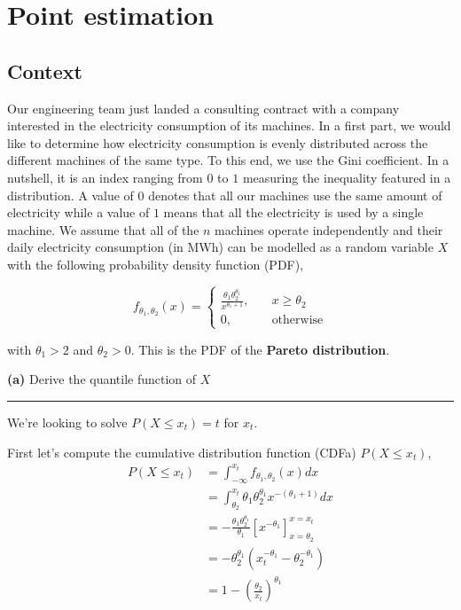 \documentclass[10pt, a4paper, nofootinbib]{scrartcl}
\begin{document}
\section{Point estimation}

\subsection*{Context}
Our engineering team just landed a consulting contract with a company interested in the electricity consumption of its machines. In a first part, we would like to determine how electricity consumption is evenly distributed across the different machines of the same type. To this end, we use the Gini coefficient. In a nutshell, it is an index ranging from $0$ to $1$ measuring the inequality featured in a distribution. A value of $0$ denotes that all our machines use the same amount of electricity while a value of $1$ means that all the electricity is used by a single machine.
We assume that all of the $n$ machines operate independently and their daily electricity consumption (in MWh) can be modelled as a random variable $X$ with the following probability density function (PDF),

\begin{equation}
  f_{\theta_1, \theta_2}(x) = 
  \begin{cases}
    \frac{\theta_1 \theta_2^{\theta_1}}{x^{\theta_1 + 1}}, &\quad x \geq \theta_2 \\
    0,                                                     &\quad \text{otherwise}
  \end{cases}
\end{equation}

with $\theta_1 > 2$ and $\theta_2 > 0$. This is the PDF of the \textbf{Pareto distribution}.

\textbf{(a)} Derive the quantile function of $X$

\begin{center}\rule{6cm}{0.4pt}\end{center}

We're looking to solve $P(X \leq x_t) = t$ for $x_t$.

First let's compute the cumulative distribution function (CDFa) $P(X \leq x_t)$, 
\begin{align*}
  P(X \leq x_t)
    &= \int_{-\infty}^{x_t} f_{\theta_1, \theta_2}(x) dx \\
    &= \int_{\theta_2}^{x_t} \theta_1 \theta_2^{\theta_1} x^{-(\theta_1 + 1)} dx \\
    &= - \frac{\theta_1 \theta_2^{\theta_1}}{\theta_1} \left[ x^{-\theta_1} \right]_{x=\theta_2}^{x=x_t} \\
    &= - \theta_2^{\theta_1} \left( x_t^{-\theta_1} - \theta_2^{-\theta_1} \right) \\
    &= 1 - \left( \frac{\theta_2}{x_t} \right)^{\theta_1}
\end{align*}
\end{document}
